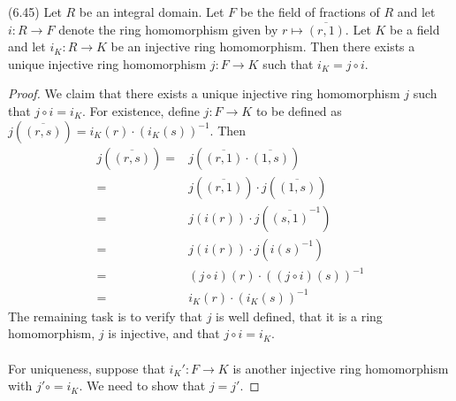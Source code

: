 \vspace{2ex}
\begin{thm}
(6.45) Let $R$ be an integral domain. Let $F$ be the field of fractions of $R$ and let $i:R\rightarrow F$ denote the ring homomorphism given by $r \mapsto \overline{(r,1)}$. Let $K$ be a field and let $i_{K}:R\rightarrow K$ be an injective ring homomorphism. Then there exists a unique injective ring homomorphism $j:F\rightarrow K$ such that $i_{K}=j\circ i$.
\end{thm}
\vspace{2ex}
\begin{proof}
We claim that there exists a unique injective ring homomorphism $j$ such that $j\circ i=i_{K}$. For existence, define $j:F\rightarrow K$ to be defined as $j(\overline{(r,s)})=i_{K}(r)\cdot (i_{K}(s))^{-1}$. Then
\begin{align*}
j(\overline{(r,s)})=&j(\overline{(r,1)}\cdot \overline{(1,s)})\\
=&j(\overline{(r,1)})\cdot j(\overline{(1,s)})\\
=&j(i(r))\cdot j(\overline{(s,1)}^{-1})\\
=&j(i(r))\cdot j(i(s)^{-1})\\
=&(j\circ i)(r)\cdot ((j\circ i)(s))^{-1}\\
=&i_K(r)\cdot (i_K(s))^{-1}
\end{align*}
The remaining task is to verify that $j$ is well defined, that it is a ring homomorphism, $j$ is injective, and that $j\circ i=i_{K}$.
\\\\
For uniqueness, suppose that $i_{K}':F\rightarrow K$ is another injective ring homomorphism with $j'\circ=i_{K}$. We need to show that $j=j'$.
\end{proof}
\vspace{2ex}


